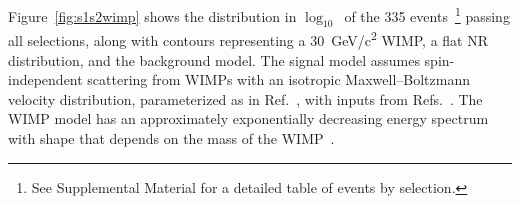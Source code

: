 Figure~\ref{fig:s1s2wimp} shows the distribution in $\log_{10}$\stwoc{\nobreakdash-}\sonec\ of the 335 events~\footnote{See Supplemental Material %
for a detailed table of events by selection.}  
passing all selections, along with contours representing a \SI{30}{GeV/c\squared} WIMP, a flat NR distribution, and the background model.
The signal model assumes spin-independent scattering from WIMPs with an isotropic Maxwell–Boltzmann velocity distribution, parameterized as in Ref.~\cite{baxter2021recommended}, with inputs from Refs.~\cite{LEWIN199687,smith2007rave,mccabe2014earth, schonrich2010local,blandhawthorn2016galaxy, gravity2021improved}.
The WIMP model has an approximately exponentially decreasing energy spectrum with shape that depends on the mass of the WIMP~\cite{LEWIN199687}.


